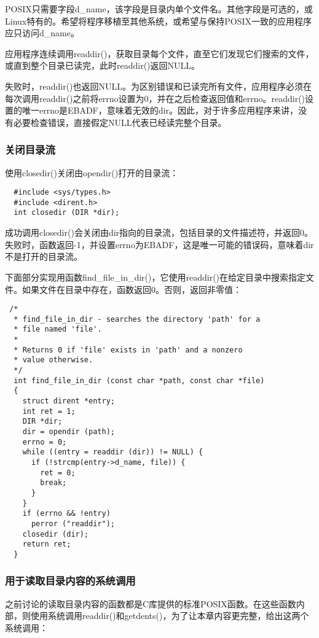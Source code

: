 POSIX只需要字段d\_name，该字段是目录内单个文件名。其他字段是可选的，或Linux特有的。希望将程序移植至其他系统，或希望与保持POSIX一致的应用程序应只访问d\_name。

应用程序连续调用readdir()，获取目录每个文件，直至它们发现它们搜索的文件，或直到整个目录已读完，此时readdir()返回NULL。

失败时，readdir()也返回NULL。为区别错误和已读完所有文件，应用程序必须在每次调用readdir()之前将errno设置为0，并在之后检查返回值和errno。readdir()设置的唯一errno是EBADF，意味着无效的dir。因此，对于许多应用程序来讲，没有必要检查错误，直接假定NULL代表已经读完整个目录。

\subsubsection{关闭目录流}

使用closedir()关闭由opendir()打开的目录流：

\begin{lstlisting}
  #include <sys/types.h>
  #include <dirent.h>
  int closedir (DIR *dir);
\end{lstlisting}

成功调用closedir()会关闭由dir指向的目录流，包括目录的文件描述符，并返回0。失败时，函数返回-1，并设置errno为EBADF，这是唯一可能的错误码，意味着dir不是打开的目录流。

下面部分实现用函数find\_file\_in\_dir()，它使用readdir()在给定目录中搜索指定文件。如果文件在目录中存在，函数返回0。否则，返回非零值：

\begin{lstlisting}
 /*
  * find_file_in_dir - searches the directory 'path' for a
  * file named 'file'.
  *
  * Returns 0 if 'file' exists in 'path' and a nonzero
  * value otherwise.
  */
  int find_file_in_dir (const char *path, const char *file)
  {
    struct dirent *entry;
    int ret = 1;
    DIR *dir;
    dir = opendir (path);
    errno = 0;
    while ((entry = readdir (dir)) != NULL) {
      if (!strcmp(entry->d_name, file)) {
        ret = 0;
        break;
      }
    }
    if (errno && !entry)
      perror ("readdir");
    closedir (dir);
    return ret;
  }
\end{lstlisting}

\subsubsection{用于读取目录内容的系统调用}

之前讨论的读取目录内容的函数都是C库提供的标准POSIX函数。在这些函数内部，则使用系统调用readdir()和getdents()，为了让本章内容更完整，给出这两个系统调用：

